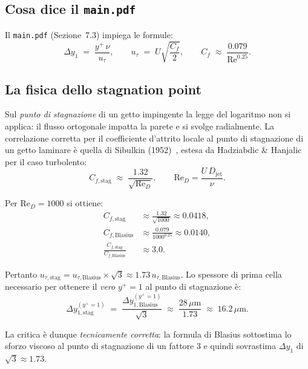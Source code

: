 \documentclass[11pt,a4paper]{article}
\newcommand{\Djet}{D_{\mathrm{jet}}}
\newcommand{\Rey}{\mathrm{Re}}
\newcommand{\mum}{\,\mu\mathrm{m}}
\begin{document}
\subsection{Cosa dice il \texttt{main.pdf}}

Il \texttt{main.pdf} (Sezione~7.3) impiega le formule:
\begin{equation}
  \Delta y_{1} \;=\; \frac{y^{+}\,\nu}{u_{\tau}},
  \qquad
  u_{\tau} \;=\; U\sqrt{\frac{C_{f}}{2}}, \qquad
  C_{f} \;\approx\; \frac{0.079}{\Rey^{0.25}}.
  \label{eq:vd_blasius}
\end{equation}

\subsection{La fisica dello stagnation point}

Sul \emph{punto di stagnazione} di un getto impingente la legge del
logaritmo non si applica: il flusso ortogonale impatta la parete e
si svolge radialmente. La correlazione corretta per il
coefficiente d'attrito locale al punto di stagnazione di un getto
laminare è quella di Sibulkin (1952)~\cite{Sibulkin1952},
estesa da Hadziabdic \& Hanjalic~\cite{Hadziabdic2008} per il
caso turbolento:
\begin{equation}
  C_{f,\mathrm{stag}} \;\approx\; \frac{1.32}{\sqrt{\Rey_{D}}},
  \qquad \Rey_{D} = \frac{U\,\Djet}{\nu}.
  \label{eq:sibulkin}
\end{equation}

Per $\Rey_{D}=1000$ si ottiene:
\begin{align}
  C_{f,\mathrm{stag}} &\approx \frac{1.32}{\sqrt{1000}} \approx 0.0418,
    \\
  C_{f,\mathrm{Blasius}} &\approx \frac{0.079}{1000^{0.25}} \approx 0.0140,
    \\
  \frac{C_{f,\mathrm{stag}}}{C_{f,\mathrm{Blasius}}}
    &\approx 3.0.
\end{align}

Pertanto $u_{\tau,\mathrm{stag}} = u_{\tau,\mathrm{Blasius}} \times
\sqrt{3} \approx 1.73\,u_{\tau,\mathrm{Blasius}}$. Lo spessore di
prima cella necessario per ottenere il \emph{vero} $y^{+}=1$ al
punto di stagnazione è:
\begin{equation}
  \Delta y_{1,\mathrm{stag}}^{(y^{+}=1)}
   \;=\; \frac{\Delta y_{1,\mathrm{Blasius}}^{(y^{+}=1)}}{\sqrt{3}}
   \;\approx\; \frac{28\mum}{1.73}
   \;\approx\; 16.2\mum.
\end{equation}

La critica è dunque \emph{tecnicamente corretta}: la formula di
Blasius sottostima lo sforzo viscoso al punto di stagnazione di un
fattore 3 e quindi sovrastima $\Delta y_{1}$ di $\sqrt{3}\approx 1.73$.
\end{document}
